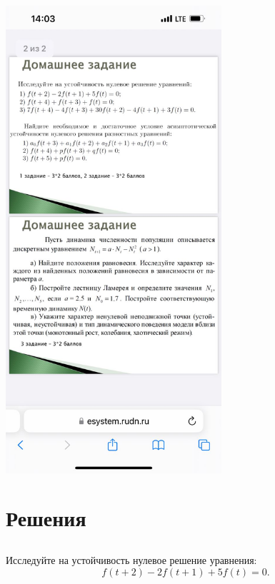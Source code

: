 \documentclass[a4paper]{article}
\begin{document}
\begin{multicols}{2}
\includegraphics[width=8cm]{photo_2.jpg}

\end{multicols}



\section{Решения}

\subsection{}
Исследуйте на устойчивость нулевое решение уравнения:
\[
	f(t + 2) - 2 f (t + 1) + 5 f(t) = 0.
\]
\end{document}
